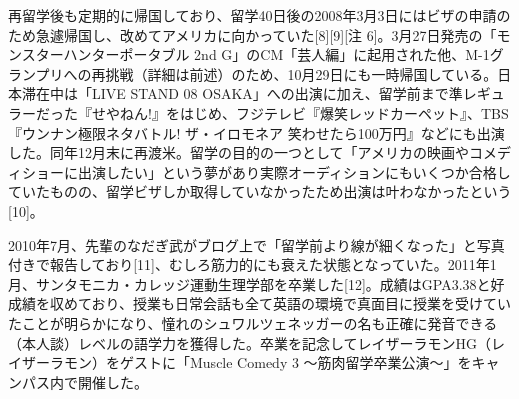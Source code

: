再留学後も定期的に帰国しており、留学40日後の2008年3月3日にはビザの申請のため急遽帰国し、改めてアメリカに向かっていた[8][9][注 6]。3月27日発売の「モンスターハンターポータブル 2nd G」のCM「芸人編」に起用された他、M-1グランプリへの再挑戦（詳細は前述）のため、10月29日にも一時帰国している。日本滞在中は「LIVE STAND 08 OSAKA」への出演に加え、留学前まで準レギュラーだった『せやねん!』をはじめ、フジテレビ『爆笑レッドカーペット』、TBS『ウンナン極限ネタバトル! ザ・イロモネア 笑わせたら100万円』などにも出演した。同年12月末に再渡米。留学の目的の一つとして「アメリカの映画やコメディショーに出演したい」という夢があり実際オーディションにもいくつか合格していたものの、留学ビザしか取得していなかったため出演は叶わなかったという[10]。

2010年7月、先輩のなだぎ武がブログ上で「留学前より線が細くなった」と写真付きで報告しており[11]、むしろ筋力的にも衰えた状態となっていた。2011年1月、サンタモニカ・カレッジ運動生理学部を卒業した[12]。成績はGPA3.38と好成績を収めており、授業も日常会話も全て英語の環境で真面目に授業を受けていたことが明らかになり、憧れのシュワルツェネッガーの名も正確に発音できる（本人談）レベルの語学力を獲得した。卒業を記念してレイザーラモンHG（レイザーラモン）をゲストに「Muscle Comedy 3 〜筋肉留学卒業公演〜」をキャンパス内で開催した。